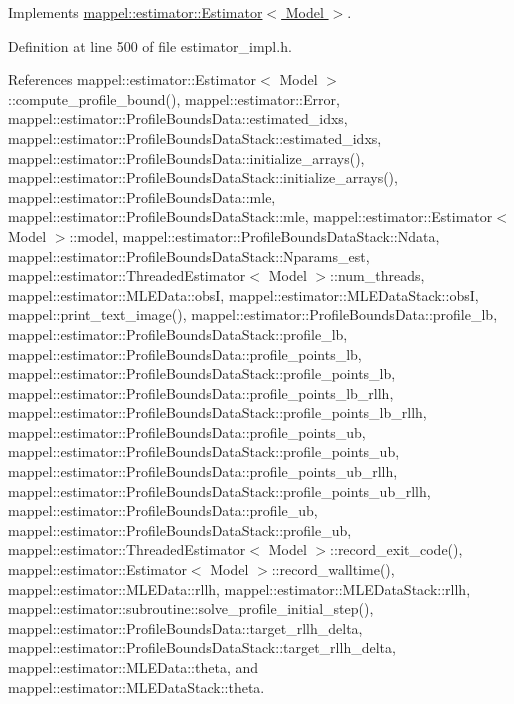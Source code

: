 Implements \hyperlink{classmappel_1_1estimator_1_1Estimator_a9c779bf059a6e93362c8aff55d225646}{mappel\+::estimator\+::\+Estimator$<$ Model $>$}.



Definition at line 500 of file estimator\+\_\+impl.\+h.



References mappel\+::estimator\+::\+Estimator$<$ Model $>$\+::compute\+\_\+profile\+\_\+bound(), mappel\+::estimator\+::\+Error, mappel\+::estimator\+::\+Profile\+Bounds\+Data\+::estimated\+\_\+idxs, mappel\+::estimator\+::\+Profile\+Bounds\+Data\+Stack\+::estimated\+\_\+idxs, mappel\+::estimator\+::\+Profile\+Bounds\+Data\+::initialize\+\_\+arrays(), mappel\+::estimator\+::\+Profile\+Bounds\+Data\+Stack\+::initialize\+\_\+arrays(), mappel\+::estimator\+::\+Profile\+Bounds\+Data\+::mle, mappel\+::estimator\+::\+Profile\+Bounds\+Data\+Stack\+::mle, mappel\+::estimator\+::\+Estimator$<$ Model $>$\+::model, mappel\+::estimator\+::\+Profile\+Bounds\+Data\+Stack\+::\+Ndata, mappel\+::estimator\+::\+Profile\+Bounds\+Data\+Stack\+::\+Nparams\+\_\+est, mappel\+::estimator\+::\+Threaded\+Estimator$<$ Model $>$\+::num\+\_\+threads, mappel\+::estimator\+::\+M\+L\+E\+Data\+::obsI, mappel\+::estimator\+::\+M\+L\+E\+Data\+Stack\+::obsI, mappel\+::print\+\_\+text\+\_\+image(), mappel\+::estimator\+::\+Profile\+Bounds\+Data\+::profile\+\_\+lb, mappel\+::estimator\+::\+Profile\+Bounds\+Data\+Stack\+::profile\+\_\+lb, mappel\+::estimator\+::\+Profile\+Bounds\+Data\+::profile\+\_\+points\+\_\+lb, mappel\+::estimator\+::\+Profile\+Bounds\+Data\+Stack\+::profile\+\_\+points\+\_\+lb, mappel\+::estimator\+::\+Profile\+Bounds\+Data\+::profile\+\_\+points\+\_\+lb\+\_\+rllh, mappel\+::estimator\+::\+Profile\+Bounds\+Data\+Stack\+::profile\+\_\+points\+\_\+lb\+\_\+rllh, mappel\+::estimator\+::\+Profile\+Bounds\+Data\+::profile\+\_\+points\+\_\+ub, mappel\+::estimator\+::\+Profile\+Bounds\+Data\+Stack\+::profile\+\_\+points\+\_\+ub, mappel\+::estimator\+::\+Profile\+Bounds\+Data\+::profile\+\_\+points\+\_\+ub\+\_\+rllh, mappel\+::estimator\+::\+Profile\+Bounds\+Data\+Stack\+::profile\+\_\+points\+\_\+ub\+\_\+rllh, mappel\+::estimator\+::\+Profile\+Bounds\+Data\+::profile\+\_\+ub, mappel\+::estimator\+::\+Profile\+Bounds\+Data\+Stack\+::profile\+\_\+ub, mappel\+::estimator\+::\+Threaded\+Estimator$<$ Model $>$\+::record\+\_\+exit\+\_\+code(), mappel\+::estimator\+::\+Estimator$<$ Model $>$\+::record\+\_\+walltime(), mappel\+::estimator\+::\+M\+L\+E\+Data\+::rllh, mappel\+::estimator\+::\+M\+L\+E\+Data\+Stack\+::rllh, mappel\+::estimator\+::subroutine\+::solve\+\_\+profile\+\_\+initial\+\_\+step(), mappel\+::estimator\+::\+Profile\+Bounds\+Data\+::target\+\_\+rllh\+\_\+delta, mappel\+::estimator\+::\+Profile\+Bounds\+Data\+Stack\+::target\+\_\+rllh\+\_\+delta, mappel\+::estimator\+::\+M\+L\+E\+Data\+::theta, and mappel\+::estimator\+::\+M\+L\+E\+Data\+Stack\+::theta.



